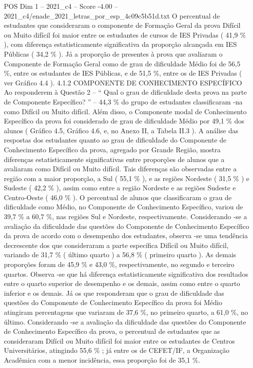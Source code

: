 \begin{textsample}{POS Dim 1 – 2021\_c4 – Score -4.00 – 2021\_c4/enade\_2021\_letras\_por\_esp\_4c09c5b51d.txt}
O percentual de estudantes que consideraram o componente de Formação Geral da prova Difícil ou Muito difícil foi maior entre os estudantes de cursos de IES Privadas ( 41,9 \% ), com diferença estatisticamente significativa da proporção alcançada em IES Públicas ( 34,2 \% ).
Já a proporção de presentes à prova que avaliaram o Componente de Formação Geral como de grau de dificuldade Médio foi de 56,5 \%, entre os estudantes de IES Públicas, e de 51,5 \%, entre os de IES Privadas ( ver Gráfico 4.4 ). 4.1.2 COMPONENTE DE CONHECIMENTO ESPECÍFICO Ao responderem à Questão 2 – “ Qual o grau de dificuldade desta prova na parte de Componente Específico? ” – 44,3 \% do grupo de estudantes classificaram -na como Difícil ou Muito difícil.
Além disso, o Componente modal de Conhecimento Específico da prova foi considerado de grau de dificuldade Médio por 49,1 \% dos alunos ( Gráfico 4.5, Gráfico 4.6, e, no Anexo II, a Tabela II.3 ).
A análise das respostas dos estudantes quanto ao grau de dificuldade do Componente de Conhecimento Específico da prova, agregado por Grande Região, mostra diferenças estatisticamente significativas entre proporções de alunos que a avaliaram como Difícil ou Muito difícil.
Tais diferenças são observadas entre a região com a maior proporção, a Sul ( 55,1 \% ), e as regiões Nordeste ( 31,5 \% ) e Sudeste ( 42,2 \% ), assim como entre a região Nordeste e as regiões Sudeste e Centro-Oeste ( 46,0 \% ).
O percentual de alunos que classificaram o grau de dificuldade como Médio, no Componente de Conhecimento Específico, variou de 39,7 \% a 60,7 \%, nas regiões Sul e Nordeste, respectivamente.
Considerando -se a avaliação da dificuldade das questões do Componente de Conhecimento Específico da prova de acordo com o desempenho dos estudantes, observa -se uma tendência decrescente dos que consideraram a parte específica Difícil ou Muito difícil, variando de 31,7 \% ( último quarto ) a 56,8 \% ( primeiro quarto ).
As demais proporções foram de 45,9 \% e 43,0 \%, respectivamente, no segundo e terceiro quartos.
Observa -se que há diferença estatisticamente significativa dos resultados entre o quarto superior de desempenho e os demais, assim como entre o quarto inferior e os demais.
Já os que responderam que o grau de dificuldade das questões do Componente de Conhecimento Específico da prova foi Médio atingiram percentagens que variaram de 37,6 \%, no primeiro quarto, a 61,0 \%, no último.
Considerando -se a avaliação da dificuldade das questões do Componente de Conhecimento Específico da prova, o percentual de estudantes que as consideraram Difícil ou Muito difícil foi maior entre os estudantes de Centros Universitários, atingindo 55,6 \% ; já entre os de CEFET/IF, a Organização Acadêmica com a menor incidência, essa proporção foi de 35,1 \%.

\end{textsample}
